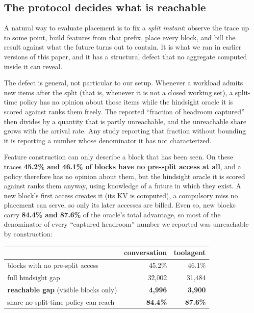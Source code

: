 \subsection{The protocol decides what is reachable}
\label{sec:reachable}
A natural way to evaluate placement is to fix a \emph{split instant}: observe the trace up to some
point, build features from that prefix, place every block, and bill the result against what the future
turns out to contain. It is what we ran in earlier versions of this paper, and it has a structural defect
that no aggregate computed inside it can reveal.

The defect is general, not particular to our setup. Whenever a workload admits new items after the split
(that is, whenever it is not a closed working set), a split-time policy has no opinion about
those items while the hindsight oracle it is scored against ranks them freely. The reported ``fraction of
headroom captured'' then divides by a quantity that is partly unreachable, and the unreachable share
grows with the arrival rate. Any study reporting that fraction without bounding it is reporting a number
whose denominator it has not characterized.

Feature construction can only describe a block that has been seen. On these traces
\textbf{45.2\% and 46.1\% of blocks have no pre-split access at all}, and a policy therefore has no
opinion about them, but the hindsight oracle it is scored against ranks them anyway, using knowledge of
a future in which they exist. A new block's first access creates it (its KV is computed), a compulsory
miss no placement can serve, so only its later accesses are billed. Even so, new blocks carry
\textbf{84.4\% and 87.6\%} of the oracle's total advantage, so most of the denominator of every
``captured headroom'' number we reported was unreachable by construction:

\begin{center}\small
\begin{tabular}{@{}lrr@{}}
\toprule
& conversation & toolagent \\
\midrule
blocks with no pre-split access & 45.2\% & 46.1\% \\
full hindsight gap & 32{,}002 & 31{,}484 \\
\textbf{reachable gap} (visible blocks only) & \textbf{4{,}996} & \textbf{3{,}900} \\
share no split-time policy can reach & \textbf{84.4\%} & \textbf{87.6\%} \\
\bottomrule
\end{tabular}
\end{center}

